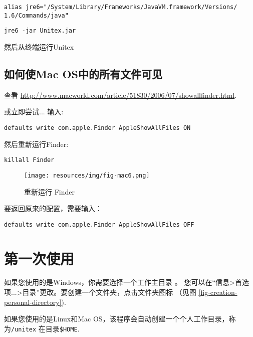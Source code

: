 \bigskip
\noindent \verb+alias jre6="/System/Library/Frameworks/JavaVM.framework/Versions/+
\noindent \verb+1.6/Commands/java"+
   
\bigskip
\noindent \verb+jre6 -jar Unitex.jar+

\bigskip
\noindent 然后从终端运行Unitex




\subsection{如何使Mac OS中的所有文件可见}
\noindent 查看
\url{http://www.macworld.com/article/51830/2006/07/showallfinder.html}.

\bigskip
\noindent 或立即尝试... 输入: 

\bigskip
\verb+defaults write com.apple.Finder AppleShowAllFiles ON+

\bigskip
\noindent 然后重新运行Finder:

\bigskip
\verb+killall Finder+

\begin{figure}[!h]
\begin{center}
\texttt{[image: resources/img/fig-mac6.png]}
\caption{重新运行 Finder\label{fig-mac6}}
\end{center}
\end{figure}

\bigskip
\noindent 要返回原来的配置，需要输入：

\bigskip
\verb+defaults write com.apple.Finder AppleShowAllFiles OFF+


\section{第一次使用}
如果您使用的是Windows，你需要选择一个工作主目录
。 您可以在“信息>首选项...>目录”更改。要创建一个文件夹，点击文件夹图标
（见图 \ref{fig-creation-personal-directory}).

\bigskip
\noindent 如果您使用的是Linux和Mac OS，该程序会自动创建一个个人工作目录，称为\verb+/unitex+ 在目录\verb+$HOME+. 

